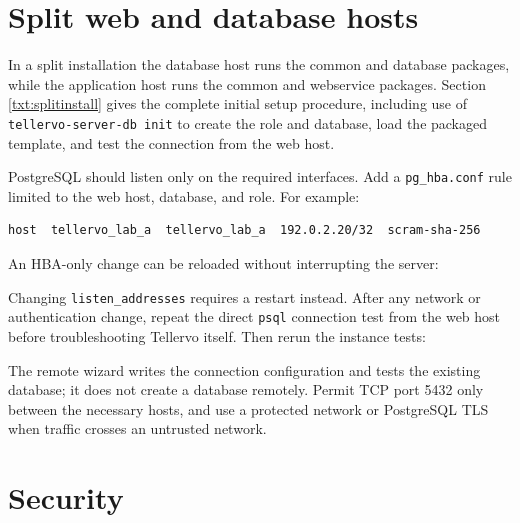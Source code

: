 \section{Split web and database hosts}

In a split installation the database host runs the common and database
packages, while the application host runs the common and webservice packages.
Section \ref{txt:splitinstall} gives the complete initial setup procedure,
including use of \verb|tellervo-server-db init| to create the role and database,
load the packaged template, and test the connection from the web host.

PostgreSQL should listen only on the required interfaces. Add a
\verb|pg_hba.conf| rule limited to the web host, database, and role. For
example:

\begin{lstlisting}
host  tellervo_lab_a  tellervo_lab_a  192.0.2.20/32  scram-sha-256
\end{lstlisting}

An HBA-only change can be reloaded without interrupting the server:


Changing \verb|listen_addresses| requires a restart instead. After any network
or authentication change, repeat the direct \verb|psql| connection test from
the web host before troubleshooting Tellervo itself. Then rerun the instance
tests:


The remote wizard writes the connection configuration and tests the existing
database; it does not create a database remotely. Permit TCP port 5432 only
between the necessary hosts, and use a protected network or PostgreSQL TLS when
traffic crosses an untrusted network.

\section{Security}


